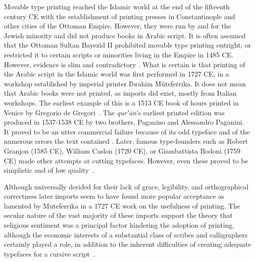 Movable type printing reached the Islamic world at the end of the fifteenth
century CE with the establishment of printing presses in Constantinople and
other cities of the Ottoman Empire. However, they were run by and for the
Jewish minority and did not produce books in Arabic script. It is often assumed
that the Ottoman Sultan Bayezid II prohibited movable type printing outright,
or restricted it to certain scripts or minorities living in the Empire in 1485
CE. However, evidence is slim and contradictory \cite{schwartz2017did}. What is
certain is that printing of the Arabic script in the Islamic world was first
performed in 1727 CE, in a workshop established by imperial printer Ibrahim
Müteferrika. It does not mean that Arabic books were not printed, as imports
did exist, mostly from Italian workshops. The earliest example of this is a
1513 CE book of hours printed in Venice by Gregorio de
Gregori~\cite{krek1979enigma}. The \emph{qurʼān}'s earliest printed edition was
produced in 1537-1538 CE by two brothers, Paganino and Alessandro Paganini. It
proved to be an utter commercial failure because of its odd typeface and of the
numerous errors the text contained \cite[pg. 219-220]{bloompaper}. Later,
famous type-founders such as Robert Granjon (1585 CE), William Caslon (1720
CE), or Giambattista Bodoni (1759 CE) made other attempts at cutting typefaces.
However, even these proved to be simplistic and of low
quality~\cite{tracy1975advances}. 

Although universally derided for their lack of grace, legibility, and
orthographical correctness later imports seem to have found more popular
acceptance as lamented by Muteferrika in a 1727 CE work on the usefulness of
printing. The secular nature of the vast majority of these imports support the
theory that religious sentiment was a principal factor hindering the adoption
of printing, although the economic interests of a substantial class of scribes
and calligraphers certainly played a role, in addition to the inherent
difficulties of creating adequate typefaces for a cursive script~\cite[pg.
605]{blair2006islamic}.

